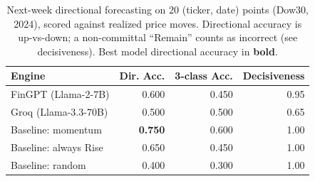 \begin{table}[t]
  \centering
  \caption{Next-week directional forecasting on 20 (ticker, date) points (Dow30, 2024), scored against realized price moves. Directional accuracy is up-vs-down; a non-committal ``Remain'' counts as incorrect (see decisiveness). Best model directional accuracy in \textbf{bold}.}
  \label{tab:forecast}
  \begin{tabular}{lrrr}
    \toprule
    Engine & Dir. Acc. & 3-class Acc. & Decisiveness \\
    \midrule
    FinGPT (Llama-2-7B) & 0.600 & 0.450 & 0.95 \\
    Groq (Llama-3.3-70B) & 0.500 & 0.500 & 0.65 \\
    \midrule
    Baseline: momentum & \textbf{0.750} & 0.600 & 1.00 \\
    Baseline: always Rise & 0.650 & 0.450 & 1.00 \\
    Baseline: random & 0.400 & 0.300 & 1.00 \\
    \bottomrule
  \end{tabular}
\end{table}
